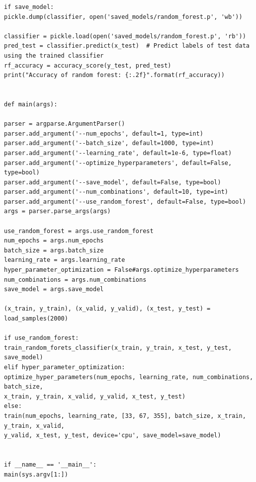 \documentclass[aps,prb,10pt,twocolumn,groupedaddress]{revtex4-1}
\begin{document}
\begin{lstlisting}
if save_model:
pickle.dump(classifier, open('saved_models/random_forest.p', 'wb'))

classifier = pickle.load(open('saved_models/random_forest.p', 'rb'))
pred_test = classifier.predict(x_test)  # Predict labels of test data using the trained classifier
rf_accuracy = accuracy_score(y_test, pred_test)
print("Accuracy of random forest: {:.2f}".format(rf_accuracy))


def main(args):

parser = argparse.ArgumentParser()
parser.add_argument('--num_epochs', default=1, type=int)
parser.add_argument('--batch_size', default=1000, type=int)
parser.add_argument('--learning_rate', default=1e-6, type=float)
parser.add_argument('--optimize_hyperparameters', default=False, type=bool)
parser.add_argument('--save_model', default=False, type=bool)
parser.add_argument('--num_combinations', default=10, type=int)
parser.add_argument('--use_random_forest', default=False, type=bool)
args = parser.parse_args(args)

use_random_forest = args.use_random_forest
num_epochs = args.num_epochs
batch_size = args.batch_size
learning_rate = args.learning_rate
hyper_parameter_optimization = False#args.optimize_hyperparameters
num_combinations = args.num_combinations
save_model = args.save_model

(x_train, y_train), (x_valid, y_valid), (x_test, y_test) = load_samples(2000)

if use_random_forest:
train_random_forets_classifier(x_train, y_train, x_test, y_test, save_model)
elif hyper_parameter_optimization:
optimize_hyper_parameters(num_epochs, learning_rate, num_combinations, batch_size,
x_train, y_train, x_valid, y_valid, x_test, y_test)
else:
train(num_epochs, learning_rate, [33, 67, 355], batch_size, x_train, y_train, x_valid,
y_valid, x_test, y_test, device='cpu', save_model=save_model)


if __name__ == '__main__':
main(sys.argv[1:])
\end{lstlisting}
\end{document}
